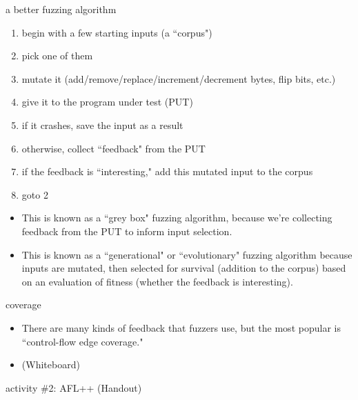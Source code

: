 \documentclass[hyphens,aspectratio=169,dvipsnames]{beamer}
\begin{document}
\begin{frame}[fragile]{a better fuzzing algorithm}
    \begin{enumerate}
        \pause \item begin with a few starting inputs (a ``corpus")
        \pause \item pick one of them
        \pause \item mutate it (add/remove/replace/increment/decrement bytes, flip bits, etc.)
        \pause \item give it to the program under test (PUT)
        \pause \item if it crashes, save the input as a result
        \pause \item otherwise, collect ``feedback" from the PUT
        \pause \item if the feedback is ``interesting," add this mutated input to the corpus
        \pause \item goto 2
    \end{enumerate}

    \begin{itemize}
        \pause \item This is known as a ``grey box" fuzzing algorithm, because we're collecting feedback from the PUT to inform input selection.
        \pause \item This is known as a ``generational" or ``evolutionary" fuzzing algorithm because inputs are mutated, then selected for survival (addition to the corpus) based on an evaluation of fitness (whether the feedback is interesting).
    \end{itemize}
\end{frame}

\begin{frame}[fragile]{coverage}
    \begin{itemize}
        \pause \item There are many kinds of feedback that fuzzers use, but the most popular is ``control-flow edge coverage."
        \pause \item (Whiteboard)
    \end{itemize}
\end{frame}

\begin{frame}[fragile]{activity \#2: AFL++}
    (Handout)
\end{frame}
\end{document}
